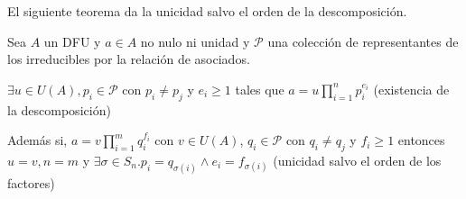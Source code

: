 El siguiente teorema da la unicidad salvo el orden de la descomposición. 

\begin{theorem}
Sea $A$ un DFU y $a \in A$ no nulo ni unidad y  $\mathcal{P}$ una colección de representantes de los irreducibles por la relación de asociados.  

$\exists u \in U(A),p_i \in \mathcal{P}$ con $p_i \neq p_j$ y $e_i \ge 1$ tales que $a = u \prod_{i = 1}^n p_i^{e_i}$ (existencia de la descomposición)

Además si, $a = v \prod_{i = 1}^m q_i^{f_i}$ con $v \in U(A)$, $q_i \in \mathcal{P}$ con $q_i \neq q_j$ y $f_i \ge 1$ entonces $u = v, n = m$ y $\exists \sigma \in S_n. p_i = q_{\sigma(i)} \land e_i = f_{\sigma(i)}$ (unicidad salvo el orden de los factores)  
\end{theorem}
